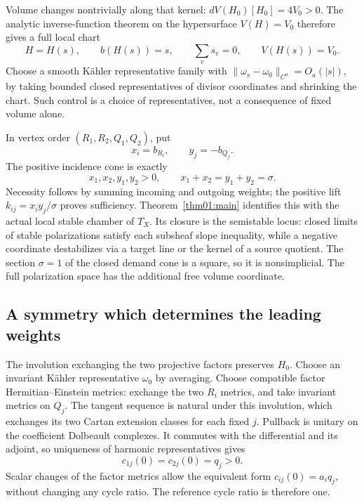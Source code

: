 \documentclass[11pt]{amsart}
\theoremstyle{definition}
\theoremstyle{remark}
\begin{document}
Volume changes nontrivially along that kernel:
\(dV(H_0)[H_0]=4V_0>0\).
The analytic inverse-function theorem on the hypersurface
\(V(H)=V_0\) therefore gives a full local chart
\begin{equation}\label{eq07:chart}
 H=H(s),\qquad b(H(s))=s,\qquad
 \sum_vs_v=0,\qquad V(H(s))=V_0.
\end{equation}
Choose a smooth Kähler representative family with
\(\|\omega_s-\omega_0\|_{C^a}=O_a(|s|)\), by taking bounded
closed representatives of divisor coordinates and shrinking
the chart. Such control is a choice of representatives, not
a consequence of fixed volume alone.

In vertex order \((R_1,R_2,Q_1,Q_2)\), put
\[
 x_i=b_{R_i},\qquad y_j=-b_{Q_j}.
\]
The positive incidence cone is exactly
\begin{equation}\label{eq07:chamber}
 x_1,x_2,y_1,y_2>0,\qquad
 x_1+x_2=y_1+y_2=\sigma.
\end{equation}
Necessity follows by summing incoming and outgoing weights;
the positive lift \(k_{ij}=x_i y_j/\sigma\) proves sufficiency.
Theorem~\ref{thm01:main} identifies this with the actual local
stable chamber of \(T_X\). Its closure is the semistable locus:
closed limits of stable polarizations satisfy each subsheaf
slope inequality, while a negative coordinate destabilizes via
a target line or the kernel of a source quotient.
The section \(\sigma=1\) of the closed demand cone is a square,
so it is nonsimplicial. The full polarization space has the
additional free volume coordinate.

\subsection{A symmetry which determines the leading weights}

The involution exchanging the two projective factors preserves
\(H_0\). Choose an invariant Kähler representative \(\omega_0\)
by averaging. Choose compatible factor Hermitian--Einstein
metrics: exchange the two \(R_i\) metrics, and take invariant
metrics on \(Q_j\).
The tangent sequence is natural under this involution, which
exchanges its two Cartan extension classes for each fixed \(j\).
Pullback is unitary on the coefficient Dolbeault complexes.
It commutes with the differential and its adjoint, so uniqueness
of harmonic representatives gives
\[
 c_{1j}(0)=c_{2j}(0)=q_j>0.
\]
Scalar changes of the factor metrics allow the equivalent form
\(c_{ij}(0)=a_iq_j\), without changing any cycle ratio.
The reference cycle ratio is therefore one.
\end{document}
